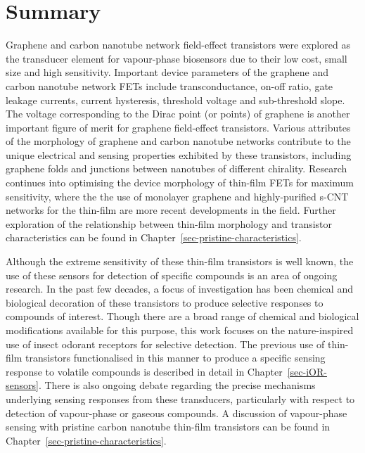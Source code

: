 \documentclass[
  a4paper,
]{scrbook}
\begin{document}
\hypertarget{summary}{%
\section{Summary}\label{summary}}

Graphene and carbon nanotube network field-effect transistors were
explored as the transducer element for vapour-phase biosensors due to
their low cost, small size and high sensitivity. Important device
parameters of the graphene and carbon nanotube network FETs include
transconductance, on-off ratio, gate leakage currents, current
hysteresis, threshold voltage and sub-threshold slope. The voltage
corresponding to the Dirac point (or points) of graphene is another
important figure of merit for graphene field-effect transistors. Various
attributes of the morphology of graphene and carbon nanotube networks
contribute to the unique electrical and sensing properties exhibited by
these transistors, including graphene folds and junctions between
nanotubes of different chirality. Research continues into optimising the
device morphology of thin-film FETs for maximum sensitivity, where the
the use of monolayer graphene and highly-purified s-CNT networks for the
thin-film are more recent developments in the field. Further exploration
of the relationship between thin-film morphology and transistor
characteristics can be found in
Chapter~\ref{sec-pristine-characteristics}.

Although the extreme sensitivity of these thin-film transistors is well
known, the use of these sensors for detection of specific compounds is
an area of ongoing research. In the past few decades, a focus of
investigation has been chemical and biological decoration of these
transistors to produce selective responses to compounds of interest.
Though there are a broad range of chemical and biological modifications
available for this purpose, this work focuses on the nature-inspired use
of insect odorant receptors for selective detection. The previous use of
thin-film transistors functionalised in this manner to produce a
specific sensing response to volatile compounds is described in detail
in Chapter~\ref{sec-iOR-sensors}. There is also ongoing debate regarding
the precise mechanisms underlying sensing responses from these
transducers, particularly with respect to detection of vapour-phase or
gaseous compounds. A discussion of vapour-phase sensing with pristine
carbon nanotube thin-film transistors can be found in
Chapter~\ref{sec-pristine-characteristics}.

\end{document}
